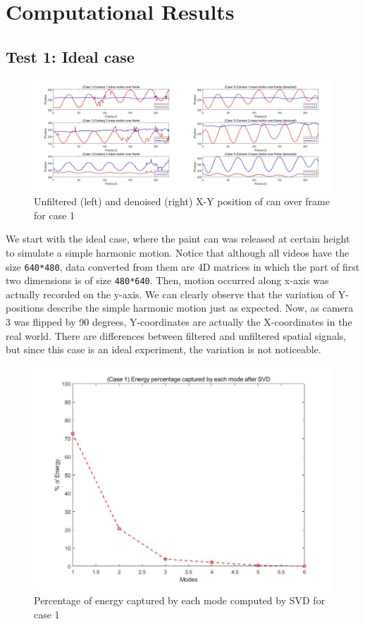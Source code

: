 \documentclass[11pt,a4paper]{article}
\numberwithin{equation}{subsection}
\begin{document}
\section{Computational Results}
\subsection{Test 1: Ideal case}
\begin{figure}[H]
\begin{center}
\includegraphics[scale=0.20]{f1.jpg}
\caption{Unfiltered (left) and denoised (right) X-Y position of can over frame for case 1}
\end{center}
\end{figure}
We start with the ideal case, where the paint can was released at certain height to simulate a simple harmonic motion. Notice that although all videos have the size \texttt{640*480}, data converted from them are 4D matrices in which the part of first two dimensions is of size \texttt{480*640}. Then, motion occurred along x-axis was actually recorded on the y-axis. We can clearly observe that the variation of Y-positions describe the simple harmonic motion just as expected. Now, as camera 3 was flipped by 90 degrees, Y-coordinates are actually the X-coordinates in the real world. There are differences between filtered and unfiltered spatial signals, but since this case is an ideal experiment, the variation is not noticeable.
\begin{figure}[H]
\begin{center}
\includegraphics[scale=0.20]{f2.jpg}
\caption{Percentage of energy captured by each mode computed by SVD for case 1}
\end{center}
\end{figure}
\end{document}
